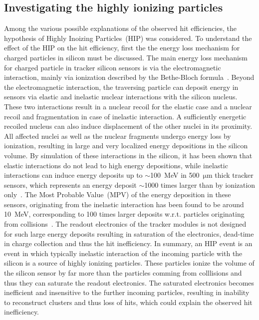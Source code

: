 \subsection{Investigating the highly ionizing particles}

Among the various possible explanations of the observed hit efficiencies, the hypothesis of Highly Inoizing Particles~(HIP) was considered. To understand the effect of the HIP on the hit efficiency, first the the energy loss mechanism for charged particles in silicon must be discussed. The main energy loss mechanism for charged particle in tracker silicon sensors is via the electromagnetic interaction, mainly via ionization described by the Bethe-Bloch formula~\cite{Groom:2000sm}. Beyond the electromagnetic interaction, the traversing particle can deposit energy in sensors via elastic and inelastic nuclear interactions with the silicon nucleus. These two interactions result in a nuclear recoil for the elastic case and a nuclear recoil and fragmentation in case of inelastic interaction. A sufficiently energetic recoiled nucleus can also induce displacement of the other nuclei in its proximity. All affected nuclei as well as the nuclear fragments undergo energy loss by ionization, resulting in large and very localized energy depositions in the silicon volume. By simulation of these interactions in the silicon, it has been shown that elastic interactions do not lead to high energy depositions, while inelastic interactions can induce energy deposits up to $\sim$100~MeV in 500~$\mathrm{\mu m}$ thick tracker sensors, which represents an energy deposit $\sim$1000 times larger than by ionization only~\cite{Huhtinen:2002yda}. The Most Probable Value~(MPV) of the energy deposition in these sensors, originating from the inelastic interaction has been found to be around 10~MeV, corresponding to 100 times larger deposits w.r.t. particles originating from collisions~\cite{Adam:2005pz}. The readout electronics of the tracker modules is not designed for such large energy deposits resulting in saturation of the electronics, dead-time in charge collection and thus the hit inefficiency. In summary, an HIP event is an event in which typically inelastic interaction of the incoming particle with the silicon is a source of highly ionizing particles. These particles ionize the volume of the silicon sensor by far more than the particles comming from colllisions and thus they can saturate the readout electronics. The saturated electronics becomes inefficient and insensitive to the further incoming particles, resulting in inability to reconstruct clusters and thus loss of hits, which could explain the observed hit inefficiency.



